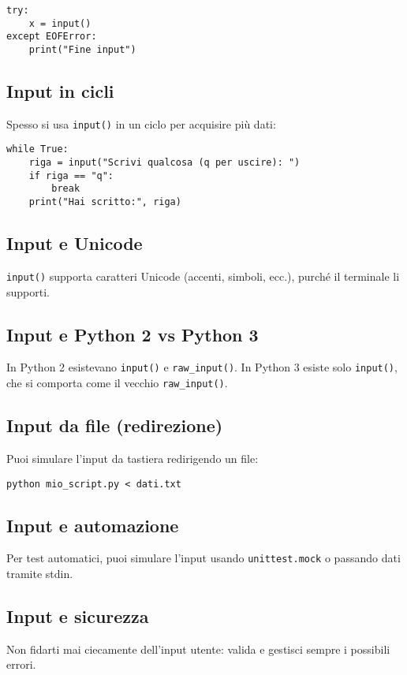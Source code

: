 \documentclass[a4paper,12pt]{article}
\begin{document}
\begin{lstlisting}
try:
    x = input()
except EOFError:
    print("Fine input")
\end{lstlisting}

\subsection*{Input in cicli}
Spesso si usa \texttt{input()} in un ciclo per acquisire più dati:

\begin{lstlisting}
while True:
    riga = input("Scrivi qualcosa (q per uscire): ")
    if riga == "q":
        break
    print("Hai scritto:", riga)
\end{lstlisting}

\subsection*{Input e Unicode}
\texttt{input()} supporta caratteri Unicode (accenti, simboli, ecc.), purché il terminale li supporti.

\subsection*{Input e Python 2 vs Python 3}
In Python 2 esistevano \texttt{input()} e \texttt{raw\_input()}. In Python 3 esiste solo \texttt{input()}, che si comporta come il vecchio \texttt{raw\_input()}.

\subsection*{Input da file (redirezione)}
Puoi simulare l'input da tastiera redirigendo un file:

\begin{verbatim}
python mio_script.py < dati.txt
\end{verbatim}

\subsection*{Input e automazione}
Per test automatici, puoi simulare l'input usando \texttt{unittest.mock} o passando dati tramite stdin.

\subsection*{Input e sicurezza}
Non fidarti mai ciecamente dell'input utente: valida e gestisci sempre i possibili errori.
\end{document}
